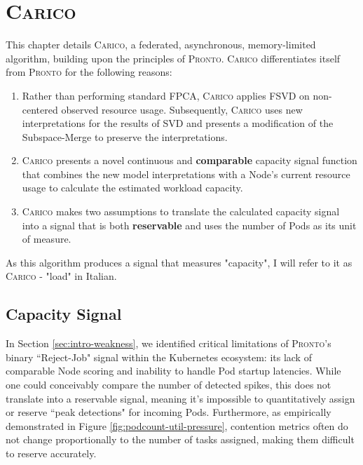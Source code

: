\chapter{\protect\textsc{Carico}}
This chapter details \textsc{Carico}, a federated, asynchronous,
memory-limited algorithm, building upon the principles of \textsc{Pronto}.
\textsc{Carico} differentiates itself from \textsc{Pronto} for the following
reasons:
\begin{enumerate}
    \item Rather than performing standard FPCA, \textsc{Carico} applies FSVD on
        non-centered observed resource usage. Subsequently, \textsc{Carico} uses
        new interpretations for the results of SVD and presents a modification
        of the Subspace-Merge to preserve the interpretations.
    \item \textsc{Carico} presents a novel continuous and \textbf{comparable}
        capacity signal function that combines the new model interpretations
        with a Node's current resource usage to calculate the estimated workload
        capacity.
    \item \textsc{Carico} makes two assumptions to translate the calculated
        capacity signal into a signal that is both \textbf{reservable} and uses
        the number of Pods as its unit of measure.
\end{enumerate}
As this algorithm produces a signal that measures "capacity", I will refer to it
as \textsc{Carico} - "load" in Italian.

\section{Capacity Signal}
In Section \ref{sec:intro-weakness}, we identified critical limitations of
\textsc{Pronto}'s binary ``Reject-Job" signal within the Kubernetes ecosystem:
its lack of comparable Node scoring and inability to handle Pod startup
latencies. While one could conceivably compare the number of detected spikes,
this does not translate into a reservable signal, meaning it's impossible to
quantitatively assign or reserve ``peak detections" for incoming Pods.
Furthermore, as empirically demonstrated in Figure
\ref{fig:podcount-util-pressure}, contention metrics often do not change
proportionally to the number of tasks assigned, making them difficult to reserve
accurately.

